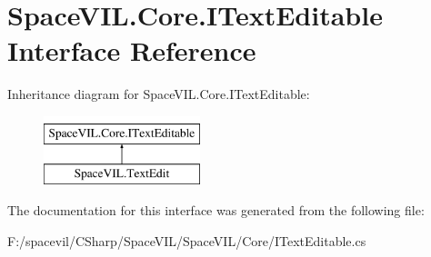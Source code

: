 \hypertarget{interface_space_v_i_l_1_1_core_1_1_i_text_editable}{}\section{Space\+V\+I\+L.\+Core.\+I\+Text\+Editable Interface Reference}
\label{interface_space_v_i_l_1_1_core_1_1_i_text_editable}
Inheritance diagram for Space\+V\+I\+L.\+Core.\+I\+Text\+Editable\+:\begin{figure}[H]
\begin{center}
\leavevmode
\includegraphics[height=2.000000cm]{interface_space_v_i_l_1_1_core_1_1_i_text_editable}
\end{center}
\end{figure}


The documentation for this interface was generated from the following file\+:\begin{DoxyCompactItemize}
\item 
F\+:/spacevil/\+C\+Sharp/\+Space\+V\+I\+L/\+Space\+V\+I\+L/\+Core/I\+Text\+Editable.\+cs\end{DoxyCompactItemize}
